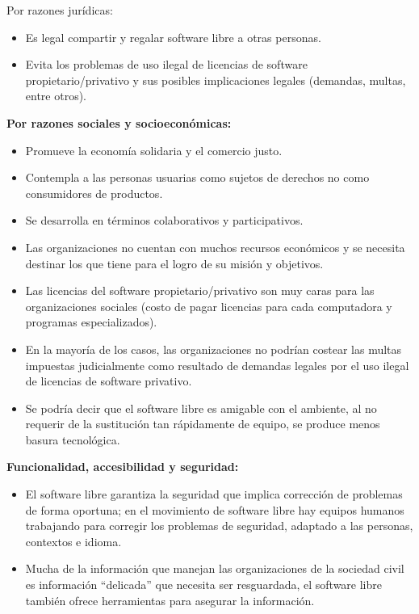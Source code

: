 Por razones jurídicas:
\begin{itemize}
\item Es legal compartir y regalar software libre a otras personas.
\item Evita los problemas de uso ilegal de licencias de software propietario/privativo y sus posibles implicaciones legales (demandas, multas, entre otros).
\end{itemize}

{\bf Por razones sociales y socioeconómicas:}
\begin{itemize}
\item Promueve la economía solidaria y el comercio justo.
\item Contempla a las personas usuarias como sujetos de derechos no como consumidores de productos.
\item Se desarrolla en términos colaborativos y participativos.
\item Las organizaciones no cuentan con muchos recursos económicos y se necesita destinar los que tiene para el logro de su misión y objetivos.
\item  Las licencias del software propietario/privativo son muy caras para las organizaciones sociales (costo de pagar licencias para cada computadora y programas 
especializados).
\item En la mayoría de los casos, las organizaciones no podrían costear las multas impuestas judicialmente como resultado de demandas legales por el uso ilegal de 
licencias de software privativo.
\item Se podría decir que el software libre es amigable con el ambiente, al no requerir de la sustitución tan rápidamente de equipo, se produce menos basura tecnológica.
\end{itemize}

{\bf Funcionalidad, accesibilidad y seguridad:}
\begin{itemize}
\item El software libre garantiza la seguridad que implica corrección de problemas de forma oportuna; en el movimiento de software libre hay equipos humanos trabajando para corregir los problemas de seguridad, adaptado a las personas, contextos e idioma.
\item   Mucha de la información que manejan las organizaciones de la sociedad civil es
información “delicada” que necesita ser resguardada, el software libre también ofrece herramientas para asegurar la información.
\end{itemize}


